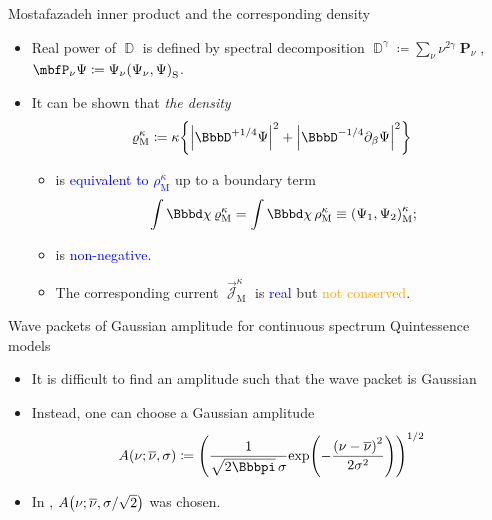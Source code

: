 \documentclass[9pt]{beamer}
\begin{document}
\begin{frame}%
{Mostafazadeh inner product and the corresponding density}%
\begin{itemize}
\item Real power of $\BbbD$ is defined by spectral decomposition
$\BbbD^{\gamma} \coloneqq \sum_\nu \nu^{2\gamma}\mbfP_\nu$,
$\mbfP_\nu\Psi \coloneqq \Psi_\nu\rbr{\Psi_\nu,\Psi}_\text{S}$.
\end{itemize}
\begin{itemize}
\item It can be shown that \emph{the density}
\begin{align}
\varrho_\text{M}^\kappa \coloneqq\kappa\cbr{
\vbr{\BbbD^{+1/4}\Psi}^2+\vbr{\BbbD^{-1/4}\partial_\beta{\Psi}}^2}
\end{align}
\begin{itemize}
\item is \textcolor{blue}{equivalent to $\rho_\text{M}^\kappa$} up to a
boundary term
\begin{align}
\int\dd\chi\,\varrho_\text{M}^\kappa = 
\int\dd\chi\,\rho_\text{M}^\kappa \equiv
\rbr{\Psi_1,\Psi_2}_\text{M}^{\kappa};
\end{align}
\item is \textcolor{blue}{non-negative}.
\item The corresponding current $\vec{\mscrJ}_\text{M}^\kappa$
is \textcolor{blue}{real} but
\textcolor{orange}{not conserved}.
\end{itemize}

\end{itemize}
\end{frame}

\begin{frame}%
{Wave packets of Gaussian amplitude for continuous spectrum}%
{Quintessence models}
\begin{itemize}
\item It is difficult to find an amplitude such that the wave packet is
Gaussian
\item Instead, one can choose a Gaussian amplitude
\begin{align}
\rfun{A}{\nu; \overline{\nu},\sigma} \coloneqq
\rbr{\frac{1}{\sqrt{2\pp}\,\sigma}\rfun{\exp}{
-\frac{\rbr{\nu-\overline{\nu}}^2}{2\sigma^2}}}^{1/2}
\end{align}

\item In ,
${A}\mathopen{}\left(\nu;\overline{\nu},\sigma/\sqrt{2}\right)\mathclose{}$ was chosen.

\end{itemize}
\end{frame}
\end{document}
